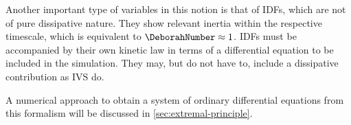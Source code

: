 Another important type of variables in this notion is that of \glspl{IDF}, which are not of pure dissipative nature.
They show relevant inertia within the respective timescale, which is equivalent to $\DeborahNumber \approx 1$.
\glspl{IDF} must be accompanied by their own kinetic law in terms of a differential equation to be included in the simulation.
They may, but do not have to, include a dissipative contribution as \gls{IVS} do.

A numerical approach to obtain a system of ordinary differential equations from this formalism will be discussed in \cref{sec:extremal-principle}.
